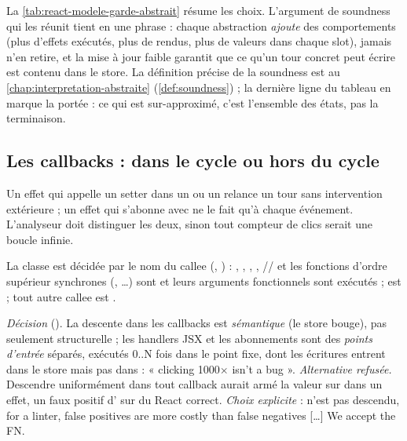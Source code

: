 La \cref{tab:react-modele-garde-abstrait} résume les choix. L'argument de
soundness qui les réunit tient en une phrase : chaque abstraction
\emph{ajoute} des comportements (plus d'effets exécutés, plus de rendus, plus
de valeurs dans chaque slot), jamais n'en retire, et la mise à jour faible
garantit que ce qu'un tour concret peut écrire est contenu dans le store. La
définition précise de la soundness est au \cref{chap:interpretation-abstraite}
(\cref{def:soundness}) ; la dernière ligne du tableau en marque la
portée : ce qui est sur-approximé, c'est l'ensemble des états, pas la
terminaison.

\subsection{Les callbacks : dans le cycle ou hors du cycle}

Un effet qui appelle un setter dans un  ou un 
relance un tour sans intervention extérieure ; un effet qui s'abonne avec
 ne le fait qu'à chaque événement. L'analyseur doit
distinguer les deux, sinon tout compteur de clics serait une boucle infinie.


La classe est décidée par le nom du callee (,
) : ,
, , ,
// et les fonctions d'ordre supérieur
synchrones (, \dots) sont  et leurs
arguments fonctionnels sont exécutés ;  est
 ; tout autre callee est .

\begin{decision}
\emph{Décision} (). La descente dans les callbacks est
\emph{sémantique} (le store bouge), pas seulement structurelle ; les handlers
JSX et les abonnements sont des \emph{points d'entrée} séparés, exécutés 0..N
fois dans le point fixe, dont les écritures entrent dans le store mais pas dans
 : « clicking 1000$\times$ isn't a bug ». \emph{Alternative
refusée.} Descendre uniformément dans tout callback aurait armé la valeur sur
 dans un effet, un
faux positif d' sur du React correct. \emph{Choix
explicite} :  n'est pas descendu, \og for a linter, false
positives are more costly than false negatives [\dots] We accept the FN\fg{}.
\end{decision}

